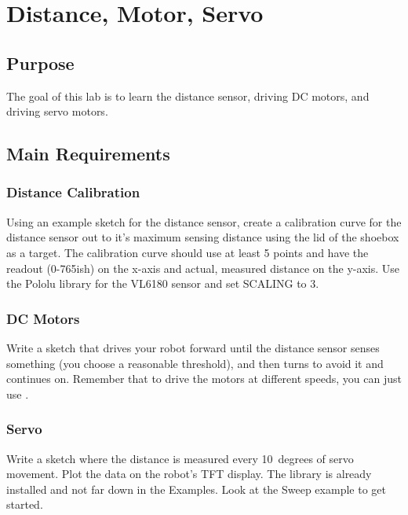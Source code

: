 \chapter{Distance, Motor, Servo}

\section{Purpose}
The goal of this lab is to learn the distance sensor, driving DC motors, and driving 
servo motors.

\section{Main Requirements}
\subsection{Distance Calibration}
Using an example sketch for the distance sensor, create a calibration curve for the distance 
sensor out to it's maximum sensing distance using the lid of the shoebox as a target. The 
calibration curve should use at least 5 points and have the readout (0-765ish) on the x-axis
and actual, measured distance on the y-axis. Use the Pololu library for the VL6180 sensor 
and set SCALING to 3.

\subsection{DC Motors}
Write a sketch that drives your robot forward until the distance sensor senses something 
(you choose a reasonable threshold), and then turns to avoid it and continues on. Remember
that to drive the motors at different speeds, you can just use \lstinline@analogWrite@. 

\subsection{Servo}
Write a sketch where the distance is measured every 10~degrees of servo movement. Plot the
data on the robot's TFT display. The \lstinline@Servo@ library is already installed and 
not far down in the Examples. Look at the Sweep example to get started.


